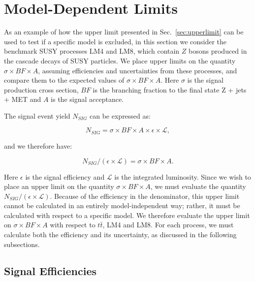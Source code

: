 \section{Model-Dependent Limits}
\label{sec:models}

As an example of how the upper limit presented in Sec.~\ref{sec:upperlimit} can be
used to test if a specific model is excluded, in this section we consider the benchmark
SUSY processes LM4 and LM8, which contain
$Z$ bosons produced in the cascade decays of SUSY particles. 
We place upper limits on the quantity $\sigma \times BF \times A$,
assuming efficiencies and uncertainties from these processes, and compare them to 
the expected values of $\sigma \times BF \times A$.
Here $\sigma$ is the signal production cross section, $BF$ is the branching fraction
to the final state Z + jets + MET and $A$ is the signal acceptance.

The signal event yield $N_{SIG}$ can be expressed as:

\begin{equation}
N_{SIG} = \sigma \times BF \times A \times \epsilon \times \mathcal{L},
\end{equation}

and we therefore have:

\begin{equation}
N_{SIG}/( \epsilon \times \mathcal{L}) = \sigma \times BF \times A.
\end{equation}

Here  $\epsilon$ is the signal efficiency and $\mathcal{L}$ is the integrated luminosity. 
Since we wish to place an upper limit on the quantity $\sigma \times BF \times A$, we must evaluate
the quantity $N_{SIG}/(\epsilon \times \mathcal{L})$.  Because of the efficiency
in the denominator, this upper limit cannot be calculated in an entirely model-independent
way; rather, it must be calculated with respect to a specific model. We therefore evaluate
the upper limit on $\sigma \times BF \times A$ with respect to $t\bar{t}$, LM4 and LM8.  
For each process, we must calculate both the efficiency and its uncertainty, as discussed
in the following subsections.



\subsection{Signal Efficiencies}
\label{sec:sigeff}

